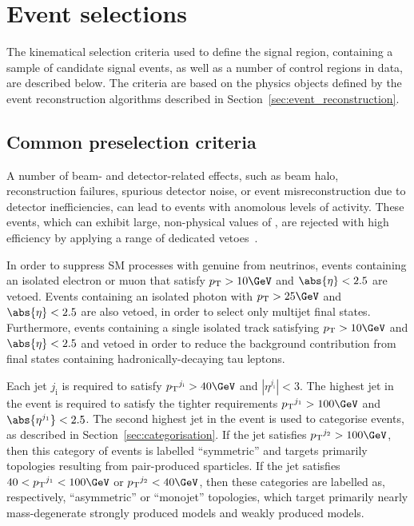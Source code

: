 \section{Event selections}
\label{sec:event_selection}

The kinematical selection criteria used to define the signal region,
containing a sample of candidate signal events, as well as a number of
control regions in data, are described below. The criteria are based
on the physics objects defined by the event reconstruction algorithms
described in Section~\ref{sec:event_reconstruction}.

\subsection{Common preselection criteria}
\label{sec:preselection}

A number of beam- and detector-related effects, such as beam halo,
reconstruction failures, spurious detector noise, or event
misreconstruction due to detector inefficiencies, can lead to events
with anomolous levels of activity. These events, which can exhibit
large, non-physical values of \ETmiss, are rejected with high
efficiency by applying a range of dedicated
vetoes~\cite{1748-0221-5-03-T03014, CMS-NOTE-2010-012, cms-met}.

In order to suppress SM processes with genuine \ETmiss from neutrinos,
events containing an isolated electron or muon that satisfy $\Pt >
10\GeV$ and $\abs{\eta} < 2.5$ are vetoed. Events containing an
isolated photon with $\Pt > 25\GeV$ and $\abs{\eta} < 2.5$ are also
vetoed, in order to select only multijet final states. Furthermore,
events containing a single isolated track satisfying $\Pt > 10\GeV$
and $\abs{\eta} < 2.5$ and vetoed in order to reduce the background
contribution from final states containing hadronically-decaying tau
leptons.

Each jet $j_\text{i}$ is required to satisfy $\Pt^{j_\text{i}} >
40\GeV$ and $|\eta^{j_\text{i}}| < 3$. The highest \Pt jet in the
event is required to satisfy the tighter requirements
$\Pt^{j_\text{1}} > 100\GeV$ and $\abs{\eta^{j_\text{1}}} < 2.5$. The
second highest \Pt jet in the event is used to categorise events, as
described in Section~\ref{sec:categorisation}. If the jet satisfies
$\Pt^{j_\text{2}} > 100\GeV$, then this category of events is labelled
``symmetric'' and targets primarily topologies resulting from
pair-produced sparticles. If the jet satisfies $40 < \Pt^{j_\text{1}}
< 100\GeV$ or $\Pt^{j_\text{2}} < 40\GeV$, then these categories are
labelled as, respectively, ``asymmetric'' or ``monojet'' topologies,
which target primarily nearly mass-degenerate strongly produced models
and weakly produced models.

